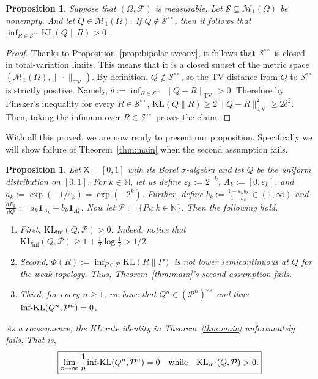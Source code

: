 \documentclass[11pt]{article}
\newcommand{\KL}{\mathrm{KL}}
\newcommand{\KLinf}{\mathrm{KL}_{\mathrm{inf}}}
\newcommand{\infKL}{\textnormal{inf-KL}}
\newcommand{\Pcal}{\mathcal{P}}
\newcommand{\X}{\mathsf{X}}
\newcommand{\one}{\mathbf{1}}
\newtheorem{proposition}[theorem]{Proposition}
\theoremstyle{definition}
\theoremstyle{definition}
\begin{document}
\begin{proposition}\label{prop:notinbipolar-positive}
Suppose that $(\Omega, \mathcal F)$ is measurable. Let $\mathcal S\subseteq \mathcal M_1(\Omega)$ be nonempty. And let $Q\in\mathcal M_1(\Omega)$. If $Q\notin\mathcal S^{\circ\circ}$, then it follows that $\inf_{R\in\mathcal S^{\circ\circ}}\KL(Q\|R)>0$.   
\end{proposition}

\begin{proof}
Thanks to Proposition~\ref{prop:bipolar-tvconv}, it follows that $\mathcal S^{\circ\circ}$ is closed in total-variation limits. This means that it is a closed subset of the metric space $(\mathcal M_1(\Omega),\|\cdot\|_{\mathrm{TV}})$. By definition, $Q\not\in\mathcal S^{\circ\circ}$, so the $\mathrm{TV}$-distance from $Q$ to $\mathcal S^{\circ\circ}$ is strictly positive. Namely, $\delta:=\inf_{R\in\mathcal S^{\circ\circ}}\|Q-R\|_{\mathrm{TV}}>0$. Therefore by Pinsker's inequality for every $R\in\mathcal S^{\circ\circ}$, $\KL(Q\|R)\ge 2\|Q-R\|_{\mathrm{TV}}^2\ge 2\delta^2$. Then, taking the infimum over $R\in\mathcal S^{\circ\circ}$ proves the claim.
\end{proof}

With all this proved, we are now ready to present our proposition. Specifically we will show failure of Theorem~\ref{thm:main} when the second assumption fails.

\begin{proposition}\label{prop:counterexample}
Let $\X=[0,1]$ with its Borel $\sigma$-algebra and let $Q$ be the uniform distribution on $[0,1]$. For $k\in\mathbb N$, let us define $\varepsilon_k:=2^{-k}$, $A_k:=[0,\varepsilon_k]$, and $a_k:=\exp(-1/\varepsilon_k)=\exp(-2^k)$. Further, define $b_k:=\frac{1-\varepsilon_k a_k}{1-\varepsilon_k}\in(1,\infty)$ and $\frac{dP_k}{dQ}:=a_k\one_{A_k}+b_k\one_{A_k^c}$. Now let $\Pcal:=\{P_k:k\in\mathbb N\}$. Then the following hold.
\begin{enumerate}
    \item First, $\KLinf(Q,\Pcal)>0$. Indeed, notice that $\KLinf(Q,\Pcal)\ge 1+\tfrac12\log\tfrac12>1/2.$
    \item   Second, $\Phi(R):=\inf_{P\in\mathcal P}\KL(R\|P)$ is not lower semicontinuous at $Q$ for the weak topology. Thus, Theorem~\ref{thm:main}'s second assumption fails.
    \item Third, for every $n\ge 1$, we have that $Q^n\in(\Pcal^n)^{\circ\circ}$ and thus $\infKL(Q^n, \Pcal^n)=0$.
\end{enumerate}
As a consequence, the KL rate identity in Theorem~\ref{thm:main} unfortunately fails. That is,
\[
\boxed{
\lim_{n\to\infty}\frac1n\infKL(Q^n,\Pcal^n)=0\quad\text{while}\quad\KL_{\inf}(Q,\Pcal)>0.
}
\]
\end{proposition}
\end{document}
